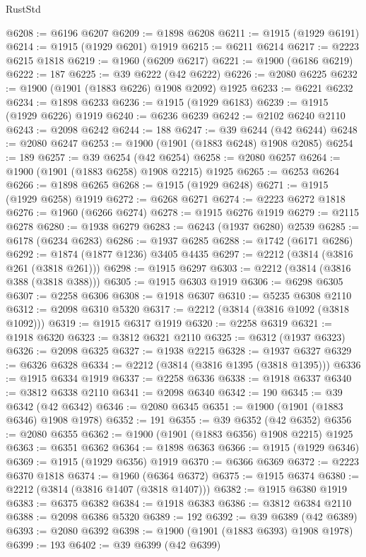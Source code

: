 \begin{lexlean}{RustStd}
\begin{coremodule}
{\begin{coremodule}
{{{{{{{{{{{{{{{{{{{{{{{{{{{{{{{{{{{{{{{{{{{@6208 := @6196 @6207
@6209 := @1898 @6208
@6211 := @1915 (@1929 @6191)
@6214 := @1915 (@1929 @6201) @1919
@6215 := @6211 @6214
@6217 := @2223 @6215 @1818
@6219 := @1960 (@6209 @6217)
@6221 := @1900 (@6186 @6219)
@6222 := 187
@6225 := @39 @6222 (@42 @6222)
@6226 := @2080 @6225
@6232 := @1900 (@1901 (@1883 @6226) @1908 @2092) @1925
@6233 := @6221 @6232
@6234 := @1898 @6233
@6236 := @1915 (@1929 @6183)
@6239 := @1915 (@1929 @6226) @1919
@6240 := @6236 @6239
@6242 := @2102 @6240 @2110
@6243 := @2098 @6242
@6244 := 188
@6247 := @39 @6244 (@42 @6244)
@6248 := @2080 @6247
@6253 := @1900 (@1901 (@1883 @6248) @1908 @2085)
@6254 := 189
@6257 := @39 @6254 (@42 @6254)
@6258 := @2080 @6257
@6264 := @1900 (@1901 (@1883 @6258) @1908 @2215) @1925
@6265 := @6253 @6264
@6266 := @1898 @6265
@6268 := @1915 (@1929 @6248)
@6271 := @1915 (@1929 @6258) @1919
@6272 := @6268 @6271
@6274 := @2223 @6272 @1818
@6276 := @1960 (@6266 @6274)
@6278 := @1915 @6276 @1919
@6279 := @2115 @6278
@6280 := @1938 @6279
@6283 := @6243 (@1937 @6280) @2539
@6285 := @6178 (@6234 @6283)
@6286 := @1937 @6285
@6288 := @1742 (@6171 @6286)
@6292 := @1874 (@1877 @1236) @3405 @4435
@6297 := @2212 (@3814 (@3816 @261 (@3818 @261)))
@6298 := @1915 @6297
@6303 := @2212 (@3814 (@3816 @388 (@3818 @388)))
@6305 := @1915 @6303 @1919
@6306 := @6298 @6305
@6307 := @2258 @6306
@6308 := @1918 @6307
@6310 := @5235 @6308 @2110
@6312 := @2098 @6310 @5320
@6317 := @2212 (@3814 (@3816 @1092 (@3818 @1092)))
@6319 := @1915 @6317 @1919
@6320 := @2258 @6319
@6321 := @1918 @6320
@6323 := @3812 @6321 @2110
@6325 := @6312 (@1937 @6323)
@6326 := @2098 @6325
@6327 := @1938 @2215
@6328 := @1937 @6327
@6329 := @6326 @6328
@6334 := @2212 (@3814 (@3816 @1395 (@3818 @1395)))
@6336 := @1915 @6334 @1919
@6337 := @2258 @6336
@6338 := @1918 @6337
@6340 := @3812 @6338 @2110
@6341 := @2098 @6340
@6342 := 190
@6345 := @39 @6342 (@42 @6342)
@6346 := @2080 @6345
@6351 := @1900 (@1901 (@1883 @6346) @1908 @1978)
@6352 := 191
@6355 := @39 @6352 (@42 @6352)
@6356 := @2080 @6355
@6362 := @1900 (@1901 (@1883 @6356) @1908 @2215) @1925
@6363 := @6351 @6362
@6364 := @1898 @6363
@6366 := @1915 (@1929 @6346)
@6369 := @1915 (@1929 @6356) @1919
@6370 := @6366 @6369
@6372 := @2223 @6370 @1818
@6374 := @1960 (@6364 @6372)
@6375 := @1915 @6374
@6380 := @2212 (@3814 (@3816 @1407 (@3818 @1407)))
@6382 := @1915 @6380 @1919
@6383 := @6375 @6382
@6384 := @1918 @6383
@6386 := @3812 @6384 @2110
@6388 := @2098 @6386 @5320
@6389 := 192
@6392 := @39 @6389 (@42 @6389)
@6393 := @2080 @6392
@6398 := @1900 (@1901 (@1883 @6393) @1908 @1978)
@6399 := 193
@6402 := @39 @6399 (@42 @6399)
}}}}}}}}}}}}}}}}}}}}}}}}}}}}}}}}}}}}}}}}}}}
\end{coremodule}}
\end{coremodule}
\end{lexlean}
